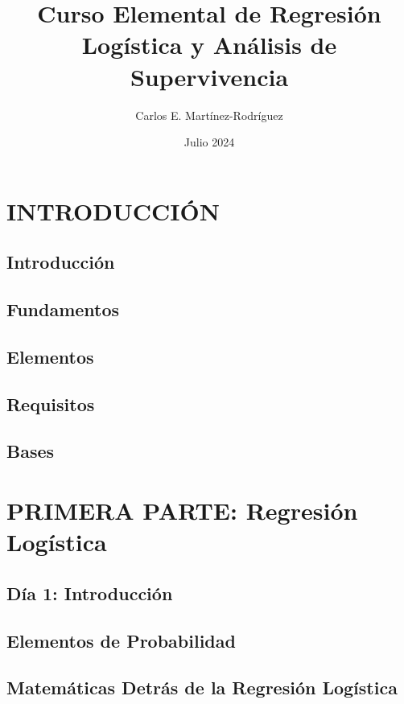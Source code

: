 \documentclass{report}
\title{Curso Elemental de Regresión Logística y Análisis de Supervivencia}
\author{Carlos E. Martínez-Rodríguez}
\date{Julio 2024}
\begin{document}
\maketitle

\tableofcontents

\part{INTRODUCCIÓN}

\chapter{Introducción}


\chapter{Fundamentos}


\chapter{Elementos}


\chapter{Requisitos}


\chapter{Bases}


\part{PRIMERA PARTE: Regresión Logística}

\chapter{Día 1: Introducción}


\chapter{Elementos de Probabilidad}


\chapter{Matemáticas Detrás de la Regresión Logística}

\end{document}
